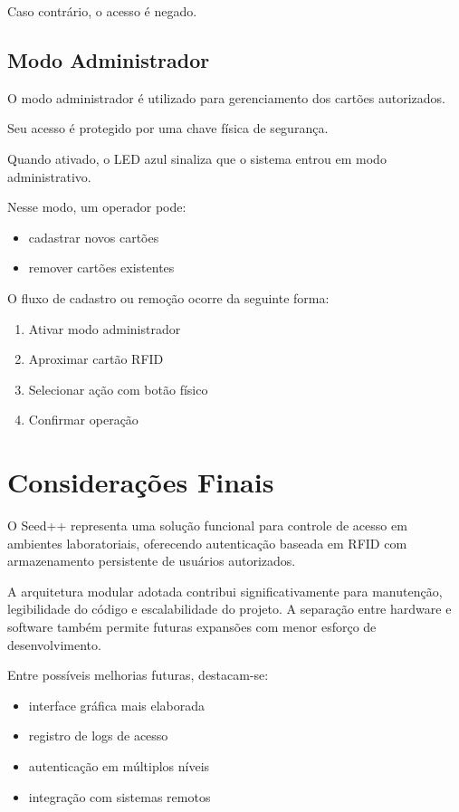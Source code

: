\documentclass[a4paper,12pt]{article}
\begin{document}
Caso contrário, o acesso é negado.

\subsection{Modo Administrador}

O modo administrador é utilizado para gerenciamento dos cartões autorizados.

Seu acesso é protegido por uma chave física de segurança.

Quando ativado, o LED azul sinaliza que o sistema entrou em modo administrativo.

Nesse modo, um operador pode:

\begin{itemize}
    \item cadastrar novos cartões
    \item remover cartões existentes
\end{itemize}

O fluxo de cadastro ou remoção ocorre da seguinte forma:

\begin{enumerate}
    \item Ativar modo administrador
    \item Aproximar cartão RFID
    \item Selecionar ação com botão físico
    \item Confirmar operação
\end{enumerate}

\section{Considerações Finais}

O Seed++ representa uma solução funcional para controle de acesso em ambientes laboratoriais, oferecendo autenticação baseada em RFID com armazenamento persistente de usuários autorizados.

A arquitetura modular adotada contribui significativamente para manutenção, legibilidade do código e escalabilidade do projeto. A separação entre hardware e software também permite futuras expansões com menor esforço de desenvolvimento.

Entre possíveis melhorias futuras, destacam-se:

\begin{itemize}
    \item interface gráfica mais elaborada
    \item registro de logs de acesso
    \item autenticação em múltiplos níveis
    \item integração com sistemas remotos
\end{itemize}
\end{document}
